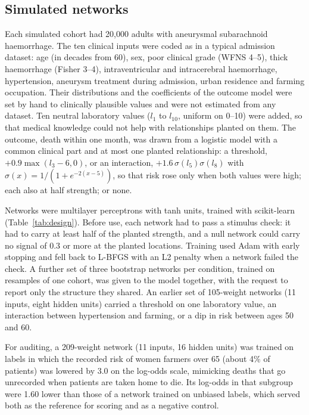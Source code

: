 \documentclass[11pt]{article}
\begin{document}
\subsection{Simulated networks}

Each simulated cohort had 20,000 adults with aneurysmal subarachnoid haemorrhage. The ten clinical inputs were coded as in a typical admission dataset: age (in decades from 60), sex, poor clinical grade (WFNS 4--5), thick haemorrhage (Fisher 3--4), intraventricular and intracerebral haemorrhage, hypertension, aneurysm treatment during admission, urban residence and farming occupation. Their distributions and the coefficients of the outcome model were set by hand to clinically plausible values and were not estimated from any dataset. Ten neutral laboratory values ($l_1$ to $l_{10}$, uniform on 0--10) were added, so that medical knowledge could not help with relationships planted on them. The outcome, death within one month, was drawn from a logistic model with a common clinical part and at most one planted relationship: a threshold, $+0.9\max(l_3-6,0)$, or an interaction, $+1.6\,\sigma(l_5)\sigma(l_8)$ with $\sigma(x)=1/(1+e^{-2(x-5)})$, so that risk rose only when both values were high; each also at half strength; or none.

Networks were multilayer perceptrons with tanh units, trained with scikit-learn (Table~\ref{tab:design}). Before use, each network had to pass a stimulus check: it had to carry at least half of the planted strength, and a null network could carry no signal of 0.3 or more at the planted locations. Training used Adam with early stopping and fell back to L-BFGS with an L2 penalty when a network failed the check. A further set of three bootstrap networks per condition, trained on resamples of one cohort, was given to the model together, with the request to report only the structure they shared. An earlier set of 105-weight networks (11 inputs, eight hidden units) carried a threshold on one laboratory value, an interaction between hypertension and farming, or a dip in risk between ages 50 and 60.

For auditing, a 209-weight network (11 inputs, 16 hidden units) was trained on labels in which the recorded risk of women farmers over 65 (about 4\% of patients) was lowered by 3.0 on the log-odds scale, mimicking deaths that go unrecorded when patients are taken home to die. Its log-odds in that subgroup were 1.60 lower than those of a network trained on unbiased labels, which served both as the reference for scoring and as a negative control.
\end{document}
